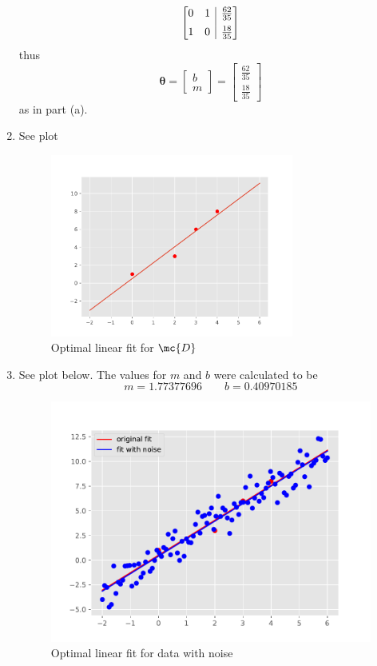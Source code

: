 \documentclass[189]{pset}
\makeatletter
\newenvironment{amatrix}[1]{%
  \left[\begin{array}{@{}*{#1}{c}|c@{}}
}{%
  \end{array}\right]
}
\makeatother
\begin{document}
\begin{enumerate}
\begin{align*}
        \begin{amatrix}{2}
          0 & 1 & \frac{62}{35} \\[.5em]
          1 & 0 & \frac{18}{35}
        \end{amatrix}
      \end{align*}
      thus
      \[
        \bm{\theta} =
        \begin{bmatrix}
          b \\
          m
        \end{bmatrix}
        =
        \begin{bmatrix}
          \frac{62}{35} \\[.5em]
          \frac{18}{35}
        \end{bmatrix}
      \]
      as in part (a).
    \item See plot
      \begin{figure}[H]
        \centering
        \includegraphics[width=8cm]{hw1pr2c.pdf}
        \caption{Optimal linear fit for $\mc{D}$}
      \end{figure}
    \item See plot below. The values for $m$ and $b$ were calculated
      to be
      \[
        m = 1.77377696 \qquad b = 0.40970185
      \]
      \begin{figure}[H]
        \centering
        \includegraphics{hw1pr2d.pdf}
        \caption{Optimal linear fit for data with noise}
      \end{figure}
  \end{enumerate}
\end{document}
